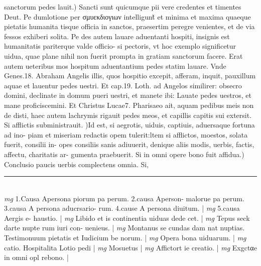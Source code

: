 \documentclass{article}
\begin{document}
\begin{pages}
sanctorum pedes lauit.) Sancti sunt quicumque pii vere credentes et timentes Deut. Pe dumlotione per σμυεκδιογιων intelligunt̃ et minima et maxima quaeque pietatis humanita tisque officia in sanctos, praesertim peregre venientes, et de via fessos exhiberi solita. Pe des autem lauare aduentanti hospiti, insignis est humanitatis pariterque valde officio- si pectoris, vt hoc exemplo significetur uidua, quae plane nihil non fuerit prompta in gratiam sanctorum facere. Erat autem ueteribus mos hospitum aduentantium pedes  statim lauare. Vnde Genes.18. Abraham Angelis illis, quos hospitio excepit, afferam, inquit, pauxillum aquae et lauentur pedes uestri. Et cap.19. Loth. ad Angelos similirer: obsecro domini, declinate in domum pueri uestri, et manete ibi: Lauate pedes uestros, et mane proficiscemini. Et Christus Lucae7. Pharisaeo ait, aquam pedibus meis non de disti, haec autem lachrymis rigauit pedes meos, et capillis capitis sui extersit.  \pend\pstart Si afflictis subministrauit. )Id est, si aegrotis, uiduis, captiuis, aduersaque fortuna ad ino- piam et miseriam redactis opem tulerit:ltem si afflictos, moestos, solata fuerit, consilii in- opes consiliis sanis adiuuerit, denique aliis modis, uerbis, factis, affectu, charitatis ar- gumenta praebuerit.  \pend\pstart Si in omni opere bono fuit affidua.) Conclusio paucis uerbis complectens omnia. Si,  \pend
\vspace{0.5cm}\noindent
\vspace{0.2cm}\rule{1cm}{0.2pt}\\ 
\hspace{0.2cm}\textit{mg}
\footnotesize 1.Causa Apersona piorum pa perum. 2.causa Aperson- malorue pa perum. 3.causa A persona aducrsario- rum. 4.cause A persona diuitum. 
\normalsize| 
\hspace{0.2cm}\textit{mg}
\footnotesize 5.causa Aergis e- haustio. 
\normalsize| 
\hspace{0.2cm}\textit{mg}
\footnotesize Libido et is continentia uiduas dede cet. 
\normalsize| 
\hspace{0.2cm}\textit{mg}
\footnotesize Tepus seck darte nupte rum iuri con- uenieus. 
\normalsize| 
\hspace{0.2cm}\textit{mg}
\footnotesize Montanus se cundas dam nat nuptias. Testimonuum pietatis et Iudicium be norum. 
\normalsize| 
\hspace{0.2cm}\textit{mg}
\footnotesize Opera bona uiduarum. 
\normalsize| 
\hspace{0.2cm}\textit{mg}
\footnotesize catio. Hospitalita Lotio pedi 
\normalsize| 
\hspace{0.2cm}\textit{mg}
\footnotesize Mosuetus 
\normalsize| 
\hspace{0.2cm}\textit{mg}
\footnotesize Affictort ie creatio. 
\normalsize| 
\hspace{0.2cm}\textit{mg}
\footnotesize Exgctαe in omni opl rebono. 
\normalsize| 

\end{pages}
\end{document}

